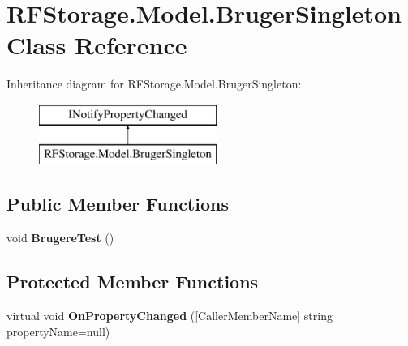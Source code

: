 \hypertarget{class_r_f_storage_1_1_model_1_1_bruger_singleton}{}\section{R\+F\+Storage.\+Model.\+Bruger\+Singleton Class Reference}
\label{class_r_f_storage_1_1_model_1_1_bruger_singleton}
Inheritance diagram for R\+F\+Storage.\+Model.\+Bruger\+Singleton\+:\begin{figure}[H]
\begin{center}
\leavevmode
\includegraphics[height=2.000000cm]{class_r_f_storage_1_1_model_1_1_bruger_singleton}
\end{center}
\end{figure}
\subsection*{Public Member Functions}
\begin{DoxyCompactItemize}
\item 
\mbox{\label{class_r_f_storage_1_1_model_1_1_bruger_singleton_aa9db8eeb384ec15fa61156deef4d1494}} 
void {\bfseries Brugere\+Test} ()
\end{DoxyCompactItemize}
\subsection*{Protected Member Functions}
\begin{DoxyCompactItemize}
\item 
\mbox{\label{class_r_f_storage_1_1_model_1_1_bruger_singleton_aedb74f78f190a4bf0156a9083a5e3b4a}} 
virtual void {\bfseries On\+Property\+Changed} (\mbox{[}Caller\+Member\+Name\mbox{]} string property\+Name=null)
\end{DoxyCompactItemize}
